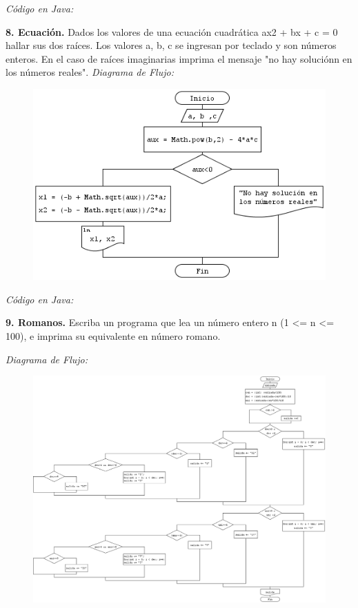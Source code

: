 \documentclass[12pt]{article}
\begin{document}
\textit{Código en Java:}

\newpage

\textbf{8. Ecuación.} Dados los valores de una ecuación cuadrática ax2 + bx + c = 0 hallar sus dos
raíces. Los valores a, b, c se ingresan por teclado y son números enteros. En el caso de
raíces imaginarias imprima el mensaje "no hay soluciónn en los números reales".
\textit{Diagrama de Flujo:  }
\begin{figure}[h!]
\centering
	\includegraphics[scale=0.80]{dicor/Ecuacion.png}    
\end{figure}

\textit{Código en Java:}

\newpage

\textbf{9.  Romanos.} Escriba un programa que lea un número entero n (1 <= n <= 100), e imprima su
equivalente en número romano.

\textit{Diagrama de Flujo:  }
\begin{figure}[h!]
\centering
	\includegraphics[scale=0.35]{dicor/Romanos.png}    
\end{figure}
\end{document}

